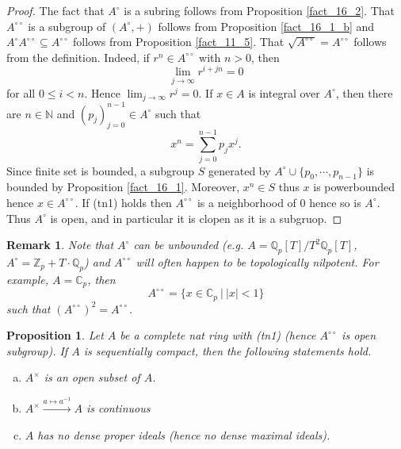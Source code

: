 \documentclass[8pt]{article}
\numberwithin{equation}{section}
\newtheorem{proposition}{Proposition}[subsection]
\newtheorem{remark}{Remark}[subsection]
\newcommand{\N}[0]{\mathbb{N}}
\newcommand{\Z}[0]{\mathbb{Z}}
\newcommand{\C}[0]{\mathbb{C}}
\newcommand{\Q}[0]{\mathbb{Q}}
\newcommand{\sep}[0]{\:|\:}
\newcommand{\dcirc}[0]{{\circ\circ}}
\begin{document}
\begin{proof}
    The fact that $A^\circ$ is a subring follows from Proposition \ref{fact_16_2}. That $A^\dcirc$ is a subgroup of $(A^\circ,+)$ follows from Proposition \ref{fact_16_1_b} and $A^\circ A^\dcirc\subseteq A^\dcirc$ follows from Proposition \ref{fact_11_5}. That $\sqrt{A^\dcirc}=A^\dcirc$ follows from the definition. Indeed, if $r^n\in A^\dcirc$ with $n>0$, then 
    \begin{equation*}
        \lim_{j\to\infty}r^{i+jn}=0
    \end{equation*}
    for all $0\leq i <n$. Hence $\lim_{j\to\infty}r^j=0$. If $x\in A$ is integral over $A^\circ$, then there are $n\in\N$ and $(p_j)_{j=0}^{n-1}\in A^\circ$ such that 
    \begin{equation*}
        x^n = \sum_{j=0}^{n-1}p_jx^j.
    \end{equation*}
    Since finite set is bounded, a subgroup $S$ generated by $A^\circ\cup\{p_0,\cdots,p_{n-1}\}$ is bounded by Proposition \ref{fact_16_1}. Moreover, $x^n\in S$ thus $x$ is powerbounded hence $x\in A^\dcirc$. If (tn1) holds then $A^\dcirc$ is a neighborhood of $0$ hence so is $A^\circ$. Thus $A^\circ$ is open, and in particular it is clopen as it is a subgruop. %
\end{proof}

\begin{remark}
    \label{remark_16_2}
    Note that $A^\circ$ can be unbounded (e.g. $A=\Q_p[T]/T^2\Q_p[T]$, $A^\circ = \Z_p+T\cdot\Q_p$) and $A^\dcirc$ will often happen to be topologically nilpotent. For example, $A=\C_p$, then 
    \begin{equation*}
        A^\dcirc = \{x\in\C_p\sep \vert x\vert<1\}
    \end{equation*}
    such that $(A^\dcirc)^2 = A^\dcirc$.
\end{remark}

\begin{proposition}
    \label{proposition_16_1}
    Let $A$ be a complete nat ring with (tn1) (hence $A^\dcirc$ is open subgroup). If $A$ is sequentially compact, then the following statements hold.
    \begin{enumerate}[a.]
        \item $A^\times$ is an open subset of $A$.
        \item $A^\times\stackrel{a\mapsto a^{-1}}{\to} A$ is continuous
        \item $A$ has no dense proper ideals (hence no dense maximal ideals).
    \end{enumerate}
\end{proposition}
\end{document}
